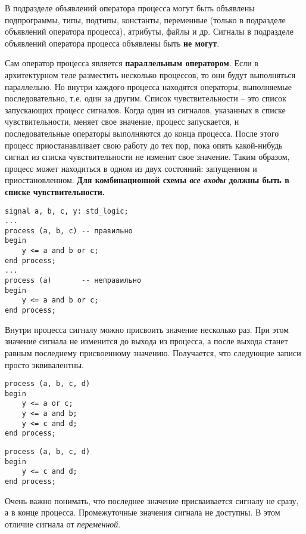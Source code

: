 В подразделе объявлений оператора процесса могут быть объявлены подпрограммы, типы, подтипы, константы, переменные (только в подразделе объявлений оператора процесса), атрибуты, файлы и др. Сигналы в подразделе объявлений оператора процесса объявлены быть \textbf{не могут}.

Сам оператор процесса является \textbf{параллельным оператором}. Если в архитектурном теле разместить несколько процессов, то они будут выполняться параллельно. Но внутри каждого процесса находятся операторы, выполняемые последовательно, т.е. один за другим. Список чувствительности – это список запускающих процесс сигналов. Когда один из сигналов, указанных в списке чувствительности, меняет свое значение, процесс запускается, и последовательные операторы выполняются до конца процесса. После этого процесс приостанавливает свою работу до тех пор, пока опять какой-нибудь сигнал из списка чувствительности не изменит свое значение. Таким образом, процесс может находиться в одном из двух состояний: запущенном и приостановленном. \textbf{Для комбинационной схемы \emph{все входы} должны быть в списке чувствительности.} 

\begin{Code}
\begin{lstlisting}
signal a, b, c, y: std_logic;
...
process (a, b, c) -- правильно
begin
    y <= a and b or c;
end process;
...
process (a)       -- неправильно
begin
    y <= a and b or c;
end process;
\end{lstlisting}
\end{Code}

Внутри процесса сигналу можно присвоить значение несколько раз. При этом значение сигнала не изменится до выхода из процесса, а после выхода станет равным последнему присвоенному значению. Получается, что следующие записи просто эквивалентны.

\begin{Code}
\begin{lstlisting}
process (a, b, c, d)
begin
    y <= a or c;
    y <= a and b;
    y <= c and d;
end process;
\end{lstlisting}
\end{Code}

\begin{Code}
\begin{lstlisting}
process (a, b, c, d)
begin
    y <= c and d;
end process;
\end{lstlisting}
\end{Code}

Очень важно понимать, что последнее значение присваивается сигналу не сразу, а в конце процесса. Промежуточные значения сигнала не доступны. В этом отличие сигнала от \emph{переменной}.

